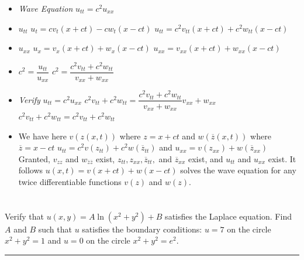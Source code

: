 \documentclass[10pt]{article}
\begin{document}
\begin{itemize}
    \item \textit{Wave Equation} $ u_{tt} = c^2u_{xx} $
    \item $ u_{tt} $
    \subitem $ u_{t} = cv_{t}(x+ct) - cw_{t}(x-ct) $
    \subitem $ u_{tt} = c^2v_{tt}(x+ct) + c^2w_{tt}(x-ct) $
    \item $ u_{xx} $
    \subitem $ u_{x} = v_{x}(x+ct) + w_{x}(x-ct) $
    \subitem $ u_{xx} = v_{xx}(x+ct) + w_{xx}(x-ct) $
    \item $ \displaystyle c^2 = \dfrac{u_{tt}}{u_{xx}} $
    \subitem $ \displaystyle c^2 = \dfrac{c^2v_{tt} + c^2w_{tt}}{v_{xx} + w_{xx}} $
    \item \textit{Verify} $ u_{tt} = c^2u_{xx} $
    \subitem $ \displaystyle c^2v_{tt} + c^2w_{tt} = \dfrac{c^2v_{tt} + c^2w_{tt}}{v_{xx} + w_{xx}}v_{xx} + w_{xx} $
    \subitem $ c^2v_{tt} + c^2w_{tt} = c^2v_{tt} + c^2w_{tt} $
    \item We have here $ v(z(x,t)) $ where $ z = x + ct $ and $ w(\overline{z}(x,t)) $ where $ \overline{z} = x - ct $
    \subitem $ u_{tt} = c^2v(z_{tt}) + c^2w(\overline{z}_{tt}) $ and $ u_{xx} = v(z_{xx}) + w(\overline{z}_{xx}) $
    \subitem Granted, $ v_{zz} $ and $ w_{\overline{z}\overline{z}} $ exist, $ z_{tt}, z_{xx}, \overline{z}_{tt}, $ and $ \overline{z}_{xx} $ exist, and $ u_{tt} $ and $ u_{xx} $ exist.
    \subitem It follows $ u(x,t) = v(x+ct) + w(x-ct) $ solves the wave equation for any twice differentiable functions $ v(z) $ and $ w(z) $.
\end{itemize}

\newpage

\section{\underline{}}
\label{sec: Problem 4}

\noindent
Verify that $ u(x,y) = A\ln{(x^2 + y^2)} + B $ satisfies the Laplace equation.
Find $ A $ and $ B $ such that $ u $ satisfies the boundary conditions: $ u = 7 $ on the circle $ x^2 + y^2 = 1 $ and $ u = 0 $ on the circle $ x^2 + y^2 = e^2 $.  \\
\vspace{2.5mm}

\hrule

\vspace{7.5mm}
\end{document}
